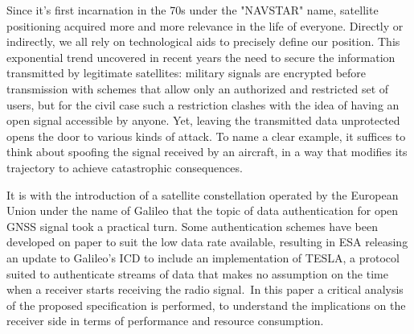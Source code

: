 
Since it's first incarnation in the 70s under the "NAVSTAR" name, satellite
positioning acquired more and more relevance in the life of everyone. Directly
or indirectly, we all rely on technological aids to precisely define our
position. This exponential trend uncovered in recent years the need to secure
the information transmitted by legitimate satellites: military signals are
encrypted before transmission with schemes that allow only an authorized and
restricted set of users, but for the civil case such a restriction clashes with
the idea of having an open signal accessible by anyone. Yet, leaving the
transmitted data unprotected opens the door to various kinds of attack. To name
a clear example, it suffices to think about spoofing the signal received by an
aircraft, in a way that modifies its trajectory to achieve catastrophic
consequences.

It is with the introduction of a satellite constellation operated by the
European Union under the name of Galileo that the topic of data authentication
for open GNSS signal took a practical turn. Some authentication schemes have
been developed on paper to suit the low data rate available, resulting in ESA
releasing an update to Galileo's ICD to include an implementation of TESLA, a
protocol suited to authenticate streams of data that makes no assumption on the
time when a receiver starts receiving the radio signal.\
In this paper a critical analysis of the proposed specification is performed, to
understand the implications on the receiver side in terms of performance and
resource consumption.
